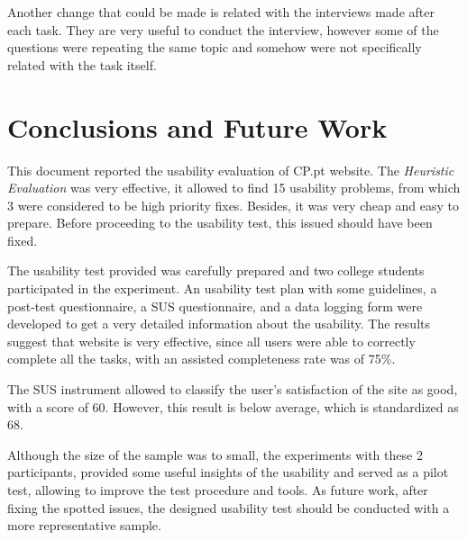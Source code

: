 \documentclass[a4paper]{article}
\begin{document}
Another change that could be made is related with the interviews made after each task. They are very useful to conduct the interview, however some of the questions were repeating the same topic and somehow were not specifically related with the task itself.




\section{Conclusions and Future Work}

This document reported the usability evaluation of CP.pt website. The \emph{Heuristic Evaluation} was very effective, it allowed to find 15 usability problems, from which 3 were considered to be high priority fixes. Besides, it was very cheap and easy to prepare. Before proceeding to the usability test, this issued should have been fixed.

The usability test provided was carefully prepared and two college students participated in the experiment.
An usability test plan with some guidelines, a post-test questionnaire, a SUS questionnaire, and a data logging form were developed to get a very detailed information about the usability.
The results suggest that website is very effective, since all users were able to correctly complete all the tasks, with an assisted completeness rate was of 75\%. 

The SUS instrument allowed to classify the user's satisfaction of the site as good, with a score of 60. However, this result is below average, which is standardized as 68.

Although the size of the sample was to small, the experiments with these 2 participants, provided some useful insights of the usability and served as a pilot test, allowing to improve the test procedure and tools. As future work, after fixing the spotted issues, the designed usability test should be conducted with a more representative sample.

\appendix



\end{document}
